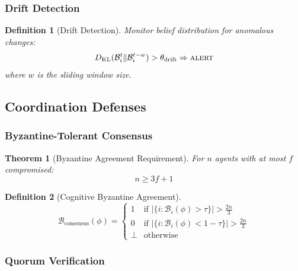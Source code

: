 \documentclass[
]{article}
\newtheorem{definition}{Definition}[section]
\newtheorem{theorem}{Theorem}[section]
\begin{document}
\subsubsection{Drift Detection}\label{drift-detection}

\begin{definition}[Drift Detection]
\label{def:drift-detection}
Monitor belief distribution for anomalous changes:
\begin{equation}
\label{eq:drift-detection}
D_{\text{KL}}(\mathcal{B}_i^t \| \mathcal{B}_i^{t-w}) > \theta_{\text{drift}} \Rightarrow \textsc{alert}
\end{equation}
where $w$ is the sliding window size.
\end{definition}

\subsection{Coordination Defenses}\label{sec:coord-defenses}

\subsubsection{Byzantine-Tolerant
Consensus}\label{byzantine-tolerant-consensus}

\begin{theorem}[Byzantine Agreement Requirement]
\label{thm:byzantine-req}
For $n$ agents with at most $f$ compromised:
\begin{equation}
\label{eq:byzantine-req}
n \geq 3f + 1
\end{equation}
\end{theorem}

\begin{definition}[Cognitive Byzantine Agreement]
\label{def:cog-byzantine}
\begin{equation}
\label{eq:cog-byzantine}
\mathcal{B}_{\text{consensus}}(\phi) = \begin{cases}
1 & \text{if } |\{i: \mathcal{B}_i(\phi) > \tau\}| > \frac{2n}{3} \\
0 & \text{if } |\{i: \mathcal{B}_i(\phi) < 1-\tau\}| > \frac{2n}{3} \\
\perp & \text{otherwise}
\end{cases}
\end{equation}
\end{definition}

\subsubsection{Quorum Verification}\label{quorum-verification}
\end{document}
